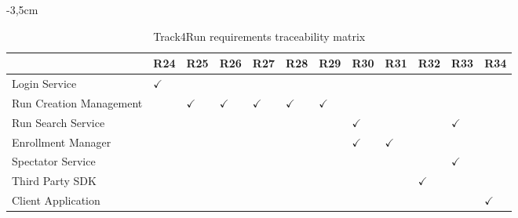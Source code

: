 \begin{table}
\begin{adjustwidth}{-3,5cm}{}
\captionsetup{justification=centering}
\caption{Track4Run requirements traceability matrix}
  \label{tab:table3}
\begin{tabular}{|l||l|l|l|l|l|l|l|l|l|l|l|}
\hline
\cellcolor[HTML]{EFEFEF}                      & \cellcolor[HTML]{EFEFEF}R24 & \cellcolor[HTML]{EFEFEF}R25 & \cellcolor[HTML]{EFEFEF}R26 & \cellcolor[HTML]{EFEFEF}R27 & \cellcolor[HTML]{EFEFEF}R28 & \cellcolor[HTML]{EFEFEF}R29 & \cellcolor[HTML]{EFEFEF}R30 & \cellcolor[HTML]{EFEFEF}R31 & \cellcolor[HTML]{EFEFEF}R32 & \cellcolor[HTML]{EFEFEF}R33 & \cellcolor[HTML]{EFEFEF}R34\\ \hline \hline
\cellcolor[HTML]{EFEFEF}Login Service     &  $\checkmark$  &    &    &   &    &    &    &    &   &   &  \\ \hline
\cellcolor[HTML]{EFEFEF}Run Creation Management         &    & $\checkmark$   &  $\checkmark$  &  $\checkmark$  & $\checkmark$  &  $\checkmark$  &    &    &   &   & \\ \hline
\cellcolor[HTML]{EFEFEF}Run Search Service    &    &    &    &    &    &    &  $\checkmark$ &   &  & $\checkmark$ & \\ \hline
\cellcolor[HTML]{EFEFEF}Enrollment Manager  &    &    &    &    &    &    & $\checkmark$   &  $\checkmark$  &   &   & \\ \hline
\cellcolor[HTML]{EFEFEF}Spectator Service  &    &    &    &    &   &    &    &    &   &  $\checkmark$ & \\ \hline
\cellcolor[HTML]{EFEFEF}Third Party SDK  &    &    &    &    &    &    &    &    &  $\checkmark$   &   &  \\ \hline
\cellcolor[HTML]{EFEFEF}Client Application  &    &    &    &    &    &    &    &    &     &   & $\checkmark$ \\ \hline
\end{tabular}
\end{adjustwidth}
\end{table}
